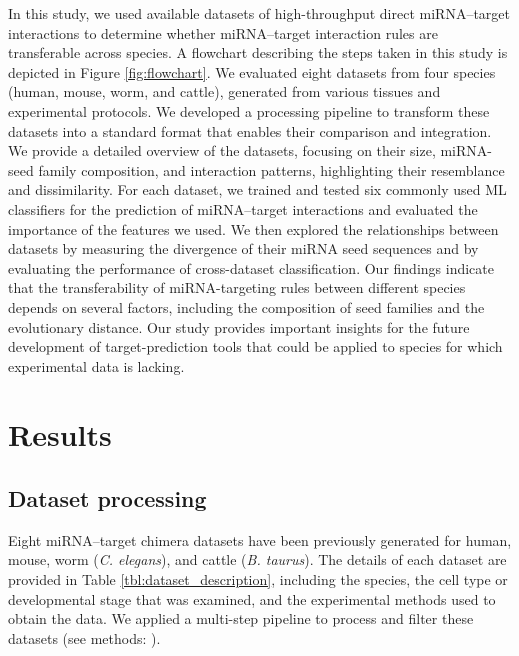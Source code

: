 \documentclass{bmcart}
\begin{document}
In this study, we used available datasets of high-throughput direct miRNA--target interactions to determine whether miRNA--target interaction rules are transferable across species. A flowchart describing the steps taken in this study is depicted in Figure \ref{fig:flowchart}. We evaluated eight datasets from four species (human, mouse, worm, and cattle), generated from various tissues and experimental protocols. We developed a processing pipeline to transform these datasets into a standard format that enables their comparison and integration. We provide a detailed overview of the datasets, focusing on their size, miRNA-seed family composition, and interaction patterns, highlighting their resemblance and dissimilarity. For each dataset, we trained and tested six commonly used ML classifiers for the prediction of miRNA--target interactions and evaluated the importance of the features we used.
We then explored the relationships between datasets by measuring the divergence of their miRNA seed sequences and by evaluating the performance of cross-dataset classification. Our findings indicate that the transferability of miRNA-targeting rules between different species depends on several factors, including the composition of seed families and the evolutionary distance. Our study provides important insights for the future development of target-prediction tools that could be applied to species for which experimental data is lacking.



\clearpage
\section*{Results}
\subsection*{Dataset processing}
Eight miRNA--target chimera datasets have been previously generated for human, mouse, worm (\textit{C. elegans}), and cattle (\textit{B. taurus}).
The details of each dataset are provided in Table \ref{tbl:dataset_description}, including the species, the cell type or developmental stage that was examined, and the experimental methods used to obtain the data. We applied a multi-step pipeline to process and filter these datasets (see methods: ).
\end{document}
